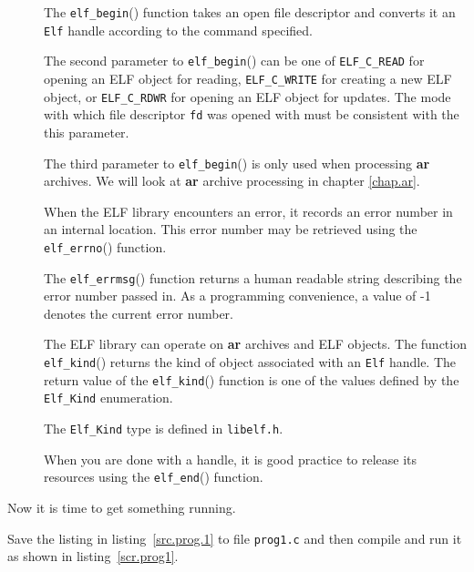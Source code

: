 \documentclass[a4paper]{report}
\makeatletter
\newcommand{\constant}[1]{\texttt{#1}}
\newcommand{\function}[1]{\texttt{#1}()}
\newcommand{\filename}[1]{\texttt{#1}}
\newcommand{\parameter}[1]{\texttt{#1}}
\newcommand{\tool}[1]{\textbf{#1}}
\newcommand{\type}[1]{\texttt{#1}}
\newenvironment{callout}[2][blue]{%
  \begingroup\newcommand{\@cocolor}{#1}%
  \newcommand{\@cogroup}[1]{#2}}{\endgroup}
\newcommand{\@co}[1]{\framebox{\textbf{\color{\@cocolor}#1}}}
\newcommand{\coref}[1]{%
  \hypertarget{\@cogroup.#1.cr}{%
    \hyperlink{\@cogroup.#1.co}{\@co{#1}}}}
\makeatother
\begin{document}
\begin{callout}{prog1}
\begin{description}
  \item[\coref{5}] The \function{elf\_begin} function takes an open file
    descriptor and converts it an \type{Elf} handle according to the
    command specified.

    The second parameter to \function{elf\_begin} can be one of
    \constant{ELF\_C\_READ} for opening an ELF object for reading,
    \constant{ELF\_C\_WRITE} for creating a new ELF object, or
    \constant{ELF\_C\_RDWR} for opening an ELF object for updates.
    The mode with which file descriptor \parameter{fd} was opened with
    must be consistent with the this parameter.

    The third parameter to \function{elf\_begin} is only used when
    processing \tool{ar} archives.  We will look at \tool{ar} archive
    processing in chapter \vref{chap.ar}.

  \item[\coref{6}] When the ELF library encounters an error, it records
    an error number in an internal location.  This error number may be
    retrieved using the \function{elf\_errno} function.

    The \function{elf\_errmsg} function returns a human readable
    string describing the error number passed in.  As a programming
    convenience, a value of -1 denotes the current error number.

  \item[\coref{3} \coref{7}] The ELF library can operate on \tool{ar}
    archives and ELF objects.  The function \function{elf\_kind}
    returns the kind of object associated with an \type{Elf} handle.
    The return value of the \function{elf\_kind} function is one of
    the values defined by the \type{Elf\_Kind} enumeration.

    The \type{Elf\_Kind} type is defined in \filename{libelf.h}.

  \item[\coref{8}] When you are done with a handle, it is good practice
    to release its resources using the \function{elf\_end} function.
  \end{description}
\end{callout}

Now it is time to get something running.

Save the listing in listing~\vref{src.prog.1} to file
\filename{prog1.c} and then compile and run it as shown in
listing~\vref{scr.prog1}.
\end{document}
